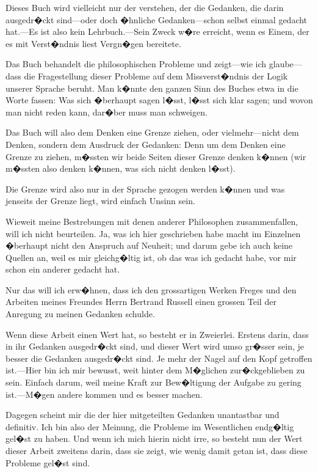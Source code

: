 

Dieses Buch wird vielleicht nur der verstehen, der
die Gedanken, die darin ausgedr�ckt sind---oder doch
�hnliche Gedanken---schon selbst einmal gedacht hat.---Es
ist also kein Lehrbuch.---Sein Zweck w�re erreicht,
wenn es Einem, der es mit Verst�ndnis liest Vergn�gen
bereitete.

Das Buch behandelt die philosophischen Probleme und
zeigt---wie ich glau\-be---dass die Fragestellung dieser Probleme
auf dem Missverst�ndnis der Logik unserer Sprache
beruht. Man k�nnte den ganzen Sinn des Buches etwa in
die Worte fassen: Was sich �berhaupt sagen l�sst, l�sst
sich klar sagen; und wovon man nicht reden kann, dar�ber
muss man schweigen.

Das Buch will also dem Denken eine Grenze ziehen, oder
viel\-mehr---nicht dem Denken, sondern dem Ausdruck der
Gedanken: Denn um dem Denken eine Grenze zu ziehen,
m�ssten wir beide Seiten dieser Grenze denken k�nnen (wir
m�ssten also denken k�nnen, was sich nicht denken
l�sst).

Die Grenze wird also nur in der Sprache gezogen werden
k�nnen und was jenseits der Grenze liegt, wird einfach
Unsinn sein.

Wieweit meine Bestrebungen mit denen anderer Philosophen
zusammenfallen, will ich nicht beurteilen. Ja, was
ich hier geschrieben habe macht im Einzelnen �berhaupt
nicht den Anspruch auf Neuheit; und darum gebe ich auch
keine Quellen an, weil es mir gleichg�ltig ist, ob das was
ich gedacht habe, vor mir schon ein anderer gedacht hat.

Nur das will ich erw�hnen, dass ich den grossartigen
Werken Freges und den Arbeiten meines Freundes Herrn
Bertrand Russell einen grossen Teil der Anregung zu
meinen Gedanken schulde.

Wenn diese Arbeit einen Wert hat, so besteht er in
Zweierlei. Erstens darin, dass in ihr Gedanken ausgedr�ckt
sind, und dieser Wert wird umso gr�sser sein, je
besser die Gedanken ausgedr�ckt sind. Je mehr der
Nagel auf den Kopf getroffen ist.---Hier bin ich mir
bewusst, weit hinter dem M�glichen zur�ckgeblieben zu
sein. Einfach darum, weil meine Kraft zur Bew�ltigung
der Aufgabe zu gering ist.---M�gen andere kommen und
es besser machen.

Dagegen scheint mir die  der hier mitgeteilten
Gedanken unantastbar und definitiv. Ich bin
also der Meinung, die Probleme im Wesentlichen
endg�ltig gel�st zu haben. Und wenn ich mich hierin
nicht irre, so besteht nun der Wert dieser Arbeit zweitens
darin, dass sie zeigt, wie wenig damit getan ist, dass
diese Probleme gel�st sind.

